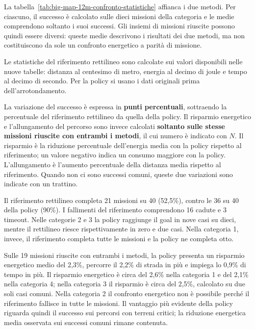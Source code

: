 \documentclass[11pt,a4paper]{article}
\begin{document}


La tabella~\ref{tab:big-map-12m-confronto-statistiche} affianca i due metodi. Per ciascuno, il successo è calcolato sulle dieci missioni della categoria e le medie comprendono soltanto i suoi successi. Gli insiemi di missioni riuscite possono quindi essere diversi: queste medie descrivono i risultati dei due metodi, ma non costituiscono da sole un confronto energetico a parità di missione.

Le statistiche del riferimento rettilineo sono calcolate sui valori disponibili nelle nuove tabelle: distanza al centesimo di metro, energia al decimo di joule e tempo al decimo di secondo. Per la policy si usano i dati originali prima dell'arrotondamento.



La variazione del successo è espressa in \textbf{punti percentuali}, sottraendo la percentuale del riferimento rettilineo da quella della policy. Il risparmio energetico e l'allungamento del percorso sono invece calcolati \textbf{soltanto sulle stesse missioni riuscite con entrambi i metodi}, il cui numero è indicato con $N$. Il risparmio è la riduzione percentuale dell'energia media con la policy rispetto al riferimento; un valore negativo indica un consumo maggiore con la policy. L'allungamento è l'aumento percentuale della distanza media rispetto al riferimento. Quando non ci sono successi comuni, queste due variazioni sono indicate con un trattino.



Il riferimento rettilineo completa 21 missioni su 40 (52,5\%), contro le 36 su 40 della policy (90\%). I fallimenti del riferimento comprendono 16 cadute e 3 timeout. Nelle categorie 2 e 3 la policy raggiunge il goal in nove casi su dieci, mentre il rettilineo riesce rispettivamente in zero e due casi. Nella categoria 1, invece, il riferimento completa tutte le missioni e la policy ne completa otto.

Sulle 19 missioni riuscite con entrambi i metodi, la policy presenta un risparmio energetico medio del 2,3\%, percorre il 2,2\% di strada in più e impiega lo 0,9\% di tempo in più. Il risparmio energetico è circa del 2,6\% nella categoria 1 e del 2,1\% nella categoria 4; nella categoria 3 il risparmio è circa del 2,5\%, calcolato su due soli casi comuni. Nella categoria 2 il confronto energetico non è possibile perché il riferimento fallisce in tutte le missioni. Il vantaggio più evidente della policy riguarda quindi il successo sui percorsi con terreni critici; la riduzione energetica media osservata sui successi comuni rimane contenuta.
\end{document}
